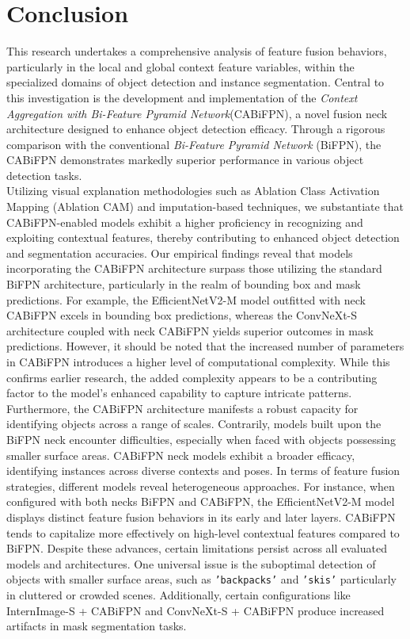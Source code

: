 \chapter{Conclusion}
This research undertakes a comprehensive analysis of feature fusion behaviors, particularly in the local and global context feature variables, within the specialized domains of object detection and instance segmentation. Central to this investigation is the development and implementation of the \textit{Context Aggregation with Bi-Feature Pyramid Network}(CABiFPN), a novel fusion neck architecture designed to enhance object detection efficacy. Through a rigorous comparison with the conventional \textit{Bi-Feature Pyramid Network }(BiFPN), the CABiFPN demonstrates markedly superior performance in various object detection tasks.\\

Utilizing visual explanation methodologies such as Ablation Class Activation Mapping (Ablation CAM) and imputation-based techniques, we substantiate that CABiFPN-enabled models exhibit a higher proficiency in recognizing and exploiting contextual features, thereby contributing to enhanced object detection and segmentation accuracies.
Our empirical findings reveal that models incorporating the CABiFPN architecture surpass those utilizing the standard BiFPN architecture, particularly in the realm of bounding box and mask predictions. For example, the EfficientNetV2-M model outfitted with neck CABiFPN excels in bounding box predictions, whereas the ConvNeXt-S architecture coupled with neck CABiFPN yields superior outcomes in mask predictions. However, it should be noted that the increased number of parameters in CABiFPN introduces a higher level of computational complexity. While this confirms earlier research, the added complexity appears to be a contributing factor to the model's enhanced capability to capture intricate patterns.\\

Furthermore, the CABiFPN architecture manifests a robust capacity for identifying objects across a range of scales. Contrarily, models built upon the BiFPN neck encounter difficulties, especially when faced with objects possessing smaller surface areas. CABiFPN neck models exhibit a broader efficacy, identifying instances across diverse contexts and poses.
In terms of feature fusion strategies, different models reveal heterogeneous approaches. For instance, when configured with both necks BiFPN and CABiFPN, the EfficientNetV2-M model displays distinct feature fusion behaviors in its early and later layers. CABiFPN tends to capitalize more effectively on high-level contextual features compared to BiFPN.
Despite these advances, certain limitations persist across all evaluated models and architectures. One universal issue is the suboptimal detection of objects with smaller surface areas, such as \texttt{'backpacks'} and \texttt{'skis'} particularly in cluttered or crowded scenes. Additionally, certain configurations like InternImage-S + CABiFPN and ConvNeXt-S + CABiFPN produce increased artifacts in mask segmentation tasks.\\

